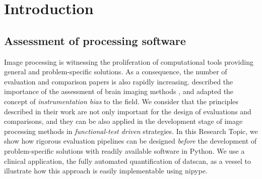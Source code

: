 \documentclass{frontiers}
\begin{document}

\glsresetall[\acronymtype]

\section{Introduction}\label{sec:intro}

\subsection{Assessment of processing software}
\label{sec:intro_software}
Image processing is witnessing the proliferation of computational tools
  providing general and problem-specific solutions.
As a consequence, the number of evaluation and comparison papers is
  also rapidly increasing.
\citeauthor{tustison_instrumentation_2013} described
  the importance of the assessment of brain imaging methods
  \citep{tustison_instrumentation_2013}, and 
  adapted the concept of \emph{instrumentation bias} to the field.
We consider that the principles described in their work are not only
  important for the design of evaluations and comparisons, 
  and they can be also applied in the development stage of image processing
  methods in \emph{functional-test driven} strategies.
In this Research Topic, we show how rigorous evaluation pipelines can be designed
  \emph{before} the development of problem-specific solutions with readily
  available software in Python.
We use a clinical application, the fully automated quantification of \gls*{datscan},
  as a vessel to illustrate how this approach is
  easily implementable using \gls*{nipype}.
\end{document}
